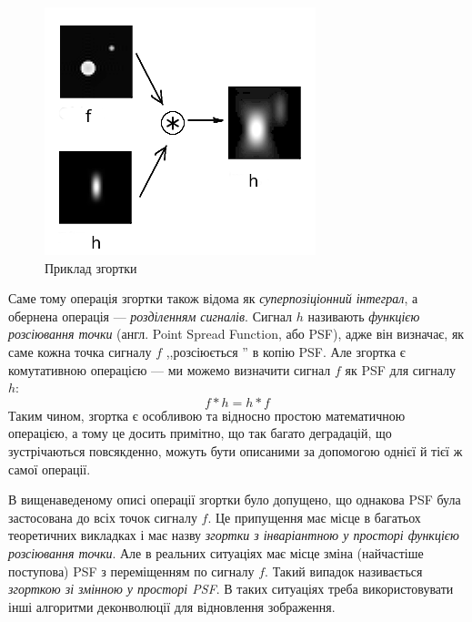 \documentclass[simple,14pt,utf8,ukrainian]{eskdtext}
\begin{document}
    \begin{figure}[!htp]
      \centering
      \includegraphics{conv.png}
      \caption{Приклад згортки}
      \label{fig:exconv}
    \end{figure}

    Саме тому операція згортки також відома як \emph{суперпозіціонний
    інтеграл}, а обернена операція --- \emph{розділенням сигналів}.
    Сигнал $h$ називають \emph{функцією розсіювання точки} (англ. Point Spread
    Function, або PSF), адже він визначає, як саме кожна точка сигналу $f$
    ,,розсіюється '' в копію PSF.
    Але згортка є комутативною операцією --- ми можемо визначити сигнал $f$ як
    PSF для сигналу $h$:
    \[ f * h = h * f \]
    Таким чином, згортка є особливою та відносно простою математичною
    операцією, а тому це досить примітно, що так багато деградацій, що
    зустрічаються повсякденно, можуть бути описаними за допомогою однієї й
    тієї ж самої операції.

    В вищенаведеному описі операції згортки було допущено, що однакова PSF
    була застосована до всіх точок сигналу $f$.
    Це припущення має місце в багатьох теоретичних викладках і має назву
    \emph{згортки з інваріантною у просторі функцією розсіювання точки}.
    Але в реальних ситуаціях має місце зміна (найчастіше поступова) PSF з
    переміщенням по сигналу $f$.
    Такий випадок називається \emph{згорткою зі змінною у просторі PSF}.
    В таких ситуаціях треба використовувати інші алгоритми деконволюції для
    відновлення зображення.\cite{book2}
    \clearpage
\end{document}
